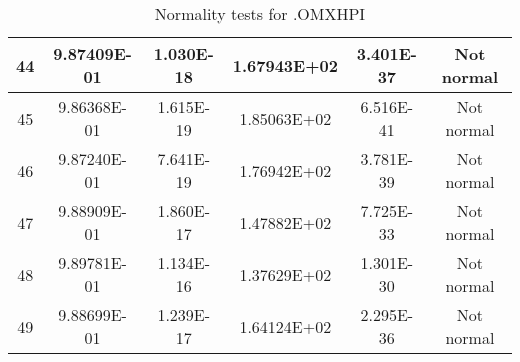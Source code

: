 \begin{table}[h]
\begin{tabular}{|c|c|c|c|c|c|}
		44 & 9.87409E-01 & 1.030E-18 & 1.67943E+02 & 3.401E-37 & Not normal\\\hline
		45 & 9.86368E-01 & 1.615E-19 & 1.85063E+02 & 6.516E-41 & Not normal\\\hline
		46 & 9.87240E-01 & 7.641E-19 & 1.76942E+02 & 3.781E-39 & Not normal\\\hline
		47 & 9.88909E-01 & 1.860E-17 & 1.47882E+02 & 7.725E-33 & Not normal\\\hline
		48 & 9.89781E-01 & 1.134E-16 & 1.37629E+02 & 1.301E-30 & Not normal\\\hline
		49 & 9.88699E-01 & 1.239E-17 & 1.64124E+02 & 2.295E-36 & Not normal\\\hline
	\end{tabular}
	\caption{Normality tests for .OMXHPI}
	\label{tab:normality_tests_OMXHPI}
\end{table}

